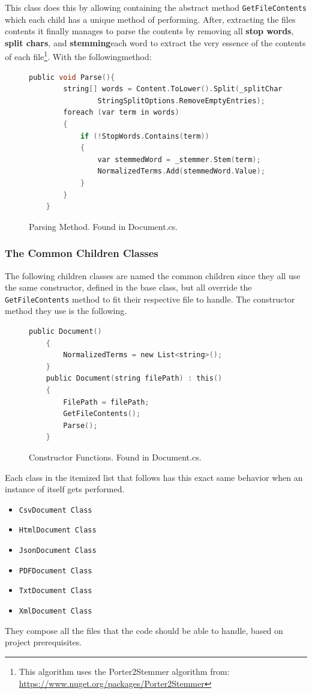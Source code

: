 \documentclass{article}
\begin{document}
This class does this by allowing containing the abstract method \texttt{GetFileContents} which each child has a unique method of performing. After, extracting the files contents it finally manages to parse the contents by removing all \textbf{stop words}, \textbf{split chars}, and \textbf{stemming}each word to extract the very essence of the contents of each file\footnote{This algorithm uses the Porter2Stemmer algorithm from: \url{https://www.nuget.org/packages/Porter2Stemmer}}. With the followingmethod:
\begin{figure}[H]
    \begin{lstlisting}[language=C]
    public void Parse(){    
        string[] words = Content.ToLower().Split(_splitChars,
                StringSplitOptions.RemoveEmptyEntries);
        foreach (var term in words) 
        {
            if (!StopWords.Contains(term))
            {
                var stemmedWord = _stemmer.Stem(term);
                NormalizedTerms.Add(stemmedWord.Value);
            }
        }
    }
    \end{lstlisting}
    \caption{Parsing Method. Found in Document.cs.}
    \label{fig:ParseMethod}
\end{figure}
\subsubsection{The Common Children Classes}
The following children classes are named the common children since they all use the same constructor, defined in the base class, but all override the \texttt{GetFileContents} method to fit their respective file to handle. The constructor method they use is the following.
\begin{figure}[H]
    \begin{lstlisting}[language=C]
    public Document() 
    {
        NormalizedTerms = new List<string>();
    }
    public Document(string filePath) : this()
    {   
        FilePath = filePath;
        GetFileContents();
        Parse();
    }
    \end{lstlisting}
    \caption{Constructor Functions. Found in Document.cs.}
    \label{fig:Constructor}
\end{figure}
Each class in the itemized list that follows has this exact same behavior when an instance of itself gets performed. 
\begin{itemize}
    \item[1.] \texttt{CsvDocument Class} 
    \item[2.] \texttt{HtmlDocument Class}
    \item[3.] \texttt{JsonDocument Class}
    \item[4.] \texttt{PDFDocument Class}
    \item[5.] \texttt{TxtDocument Class}
    \item[6.] \texttt{XmlDocument Class}
\end{itemize}
They compose all the files that the code should be able to handle, based on project prerequisites.
\end{document}
